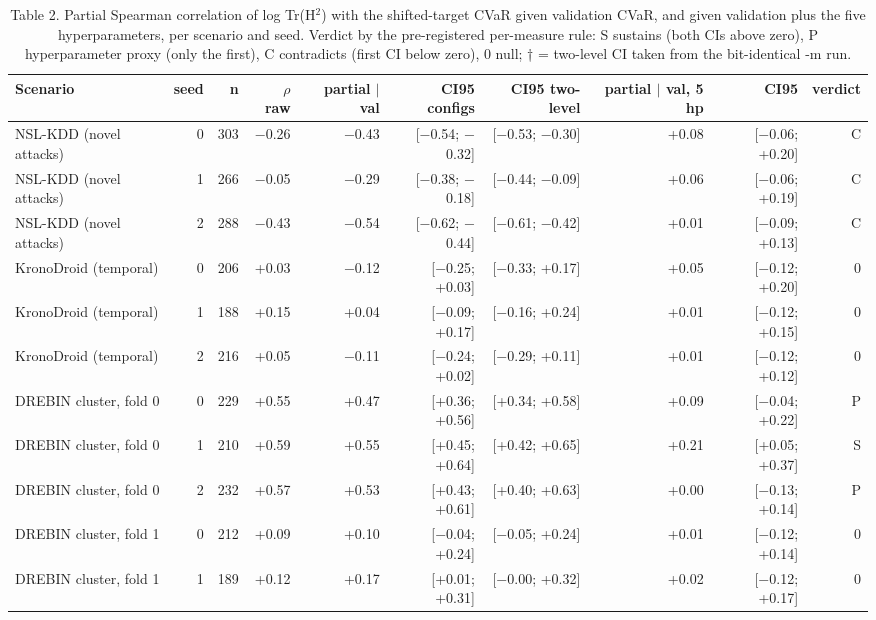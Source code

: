 \begin{table}[t]
\centering\small
\caption{Table 2. Partial Spearman correlation of log Tr(H$^2$) with the shifted-target CVaR given validation CVaR, and given validation plus the five hyperparameters, per scenario and seed. Verdict by the pre-registered per-measure rule: S sustains (both CIs above zero), P hyperparameter proxy (only the first), C contradicts (first CI below zero), 0 null; † = two-level CI taken from the bit-identical -m run.}
\label{tab:main_e0}
\begin{tabular}{lrrrrrrrrr}
\toprule
Scenario & seed & n & $\rho$ raw & partial $\mid$ val & CI95 configs & CI95 two-level & partial $\mid$ val, 5 hp & CI95 & verdict \\
\midrule
NSL-KDD (novel attacks) & 0 & 303 & $-$0.26 & $-$0.43 & [$-$0.54; $-$0.32] & [$-$0.53; $-$0.30] & +0.08 & [$-$0.06; +0.20] & C \\
NSL-KDD (novel attacks) & 1 & 266 & $-$0.05 & $-$0.29 & [$-$0.38; $-$0.18] & [$-$0.44; $-$0.09] & +0.06 & [$-$0.06; +0.19] & C \\
NSL-KDD (novel attacks) & 2 & 288 & $-$0.43 & $-$0.54 & [$-$0.62; $-$0.44] & [$-$0.61; $-$0.42] & +0.01 & [$-$0.09; +0.13] & C \\
KronoDroid (temporal) & 0 & 206 & +0.03 & $-$0.12 & [$-$0.25; +0.03] & [$-$0.33; +0.17] & +0.05 & [$-$0.12; +0.20] & 0 \\
KronoDroid (temporal) & 1 & 188 & +0.15 & +0.04 & [$-$0.09; +0.17] & [$-$0.16; +0.24] & +0.01 & [$-$0.12; +0.15] & 0 \\
KronoDroid (temporal) & 2 & 216 & +0.05 & $-$0.11 & [$-$0.24; +0.02] & [$-$0.29; +0.11] & +0.01 & [$-$0.12; +0.12] & 0 \\
DREBIN cluster, fold 0 & 0 & 229 & +0.55 & +0.47 & [+0.36; +0.56] & [+0.34; +0.58] & +0.09 & [$-$0.04; +0.22] & P \\
DREBIN cluster, fold 0 & 1 & 210 & +0.59 & +0.55 & [+0.45; +0.64] & [+0.42; +0.65] & +0.21 & [+0.05; +0.37] & S \\
DREBIN cluster, fold 0 & 2 & 232 & +0.57 & +0.53 & [+0.43; +0.61] & [+0.40; +0.63] & +0.00 & [$-$0.13; +0.14] & P \\
DREBIN cluster, fold 1 & 0 & 212 & +0.09 & +0.10 & [$-$0.04; +0.24] & [$-$0.05; +0.24] & +0.01 & [$-$0.12; +0.14] & 0 \\
DREBIN cluster, fold 1 & 1 & 189 & +0.12 & +0.17 & [+0.01; +0.31] & [$-$0.00; +0.32] & +0.02 & [$-$0.12; +0.17] & 0 \\

\end{tabular}
\end{table}
